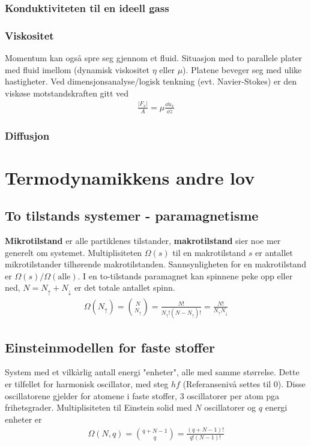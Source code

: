 \documentclass[12pt]{article}
\begin{document}
\subsubsection{Konduktiviteten til en ideell gass}
\subsubsection{Viskositet}
Momentum kan også spre seg gjennom et fluid. Situasjon med to parallele plater
med fluid imellom (dynamisk viskositet $\eta$ eller $\mu$). Platene beveger seg med ulike hastigheter.
Ved dimensjonsanalyse/logisk tenkning (evt. Navier-Stokes) er den viskøse motstandskraften
gitt ved
\begin{align*}
  \frac{|F_x|}{A} = \mu \frac{\dd u_x}{\dd z}
\end{align*}
\subsubsection{Diffusjon}

\section{Termodynamikkens andre lov}
\subsection{To tilstands systemer - paramagnetisme}
\textbf{Mikrotilstand} er alle partiklenes tilstander, \textbf{makrotilstand} sier
noe mer generelt om systemet. Multiplisiteten $\Omega(s)$ til en makrotilstand $s$ er antallet mikrotilstander
tilhørende makrotilstanden. Sannsynligheten for en makrotilstand er $\Omega(s)/\Omega(\text{alle})$. I en
to-tilstands paramagnet kan spinnene peke opp eller ned, $N = N_\uparrow + N_\downarrow$ er det totale antallet
spinn.
\begin{align*}
  \Omega(N_\uparrow) = \binom{N}{N_\uparrow} = \frac{N!}{N_\uparrow! (N - N_\uparrow)!} = \frac{N!}{N_\uparrow N_\downarrow}
\end{align*}
\subsection{Einsteinmodellen for faste stoffer}
System med et vilkårlig antall energi "enheter", alle med samme størrelse. Dette
er tilfellet for harmonisk oscillator, med steg $hf$ (Referansenivå settes til 0).
Disse oscillatorene gjelder for atomene i faste stoffer, 3 oscillatorer per atom
pga frihetsgrader. Multiplisiteten til Einstein solid med $N$ oscillatorer og
$q$ energi enheter er
\begin{align*}
  \Omega(N,q) = \binom{q + N - 1}{q} = \frac{(q + N - 1)!}{q!(N-1)!}
\end{align*}
\end{document}

